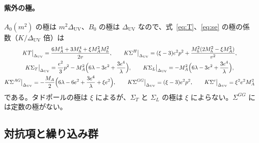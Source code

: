 \documentclass[a4paper,10pt]{ltjsarticle}
\newcommand{\DUV}{\Delta_{\mathrm{UV}}}
\begin{document}
\paragraph{紫外の極。}$A_0(m^2)$ の極は $m^2\DUV$、$B_0$ の極は $\DUV$ なので、式~\eqref{eq:T}、\eqref{eq:se} の極の係数（$K/\DUV$ 倍）は
\begin{equation}
\begin{gathered}
KT\big|_{\DUV}=\frac{6M_A^4+3M_h^4+\xi M_A^2M_h^2}{2v},\qquad
K\Sigma^H\big|_{\DUV}=(\xi-3)e^2p^2+\frac{M_h^2(2M_h^2-\xi M_A^2)}{v^2},\\
K\Sigma_T\big|_{\DUV}=\frac{e^2}3p^2-M_A^2\Bigl(6\lambda-3e^2+\frac{3e^4}\lambda\Bigr),\qquad
K\Sigma_L\big|_{\DUV}=-M_A^2\Bigl(6\lambda-3e^2+\frac{3e^4}\lambda\Bigr),\\
K\Sigma^{AG}\big|_{\DUV}=-\frac{M_A}2\Bigl(6\lambda-6e^2+\frac{3e^4}\lambda+\xi e^2\Bigr),\qquad
K\Sigma^{GG}\big|_{\DUV}=(\xi-3)e^2p^2,\qquad
K\Sigma^c\big|_{\DUV}=\xi^2e^2M_A^2
\end{gathered}
\label{eq:uv}
\end{equation}
である。タドポールの極は $\xi$ によるが、$\Sigma_T$ と $\Sigma_L$ の極は $\xi$ によらない。$\Sigma^{GG}$ には定数の極がない。

\subsection{対抗項と繰り込み群}\label{sec:ren}
\end{document}

